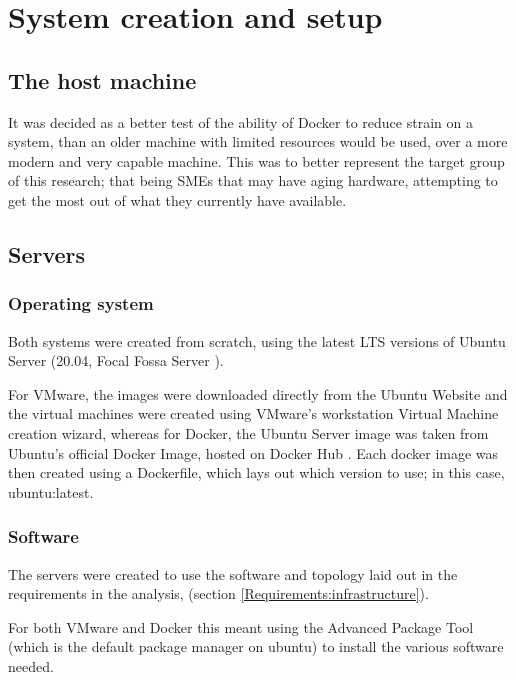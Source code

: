 
\chapter{System creation and setup}
\section{The host machine}
It was decided as a better test of the ability of Docker to reduce strain on a system, than an older machine with limited resources would be used, over a more modern and very capable machine. This was to better represent the target group of this research; that being SMEs that may have aging hardware, attempting to get the most out of what they currently have available.

\section{Servers}
\subsection{Operating system}
Both systems were created from scratch, using the latest LTS versions of Ubuntu Server (20.04, Focal Fossa Server \citep{UbuntuServerDocumentation}).

For VMware, the images were downloaded directly from the Ubuntu Website and the virtual machines were created using VMware's workstation Virtual Machine creation wizard, whereas for Docker, the Ubuntu Server image was taken from Ubuntu's official Docker Image, hosted on Docker Hub \citep{UbuntuDockerHub}. Each docker image was then created using a Dockerfile, which lays out which version to use; in this case, ubuntu:latest.

\subsection{Software}
The servers were created to use the software and topology laid out in the requirements in the analysis, (section \ref{Requirements:infrastructure}).

For both VMware and Docker this meant using the Advanced Package Tool (which is the default package manager on ubuntu) to install the various software needed.

